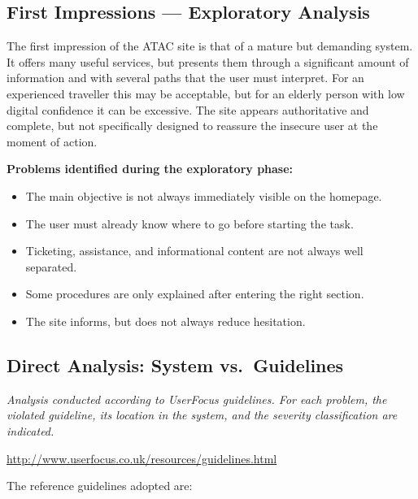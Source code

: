 ﻿\documentclass[11pt,a4paper]{article}
\begin{document}
\subsection*{First Impressions --- Exploratory Analysis}

\noindent The first impression of the ATAC site is that of a mature but demanding system. It offers many useful services, but presents them through a significant amount of information and with several paths that the user must interpret. For an experienced traveller this may be acceptable, but for an elderly person with low digital confidence it can be excessive. The site appears authoritative and complete, but not specifically designed to reassure the insecure user at the moment of action.

\noindent\textbf{Problems identified during the exploratory phase:}

\begin{itemize}
    \item The main objective is not always immediately visible on the homepage.
    \item The user must already know where to go before starting the task.
    \item Ticketing, assistance, and informational content are not always well separated.
    \item Some procedures are only explained after entering the right section.
    \item The site informs, but does not always reduce hesitation.
\end{itemize}

\subsection*{Direct Analysis: System vs.\ Guidelines}

\noindent\textit{Analysis conducted according to UserFocus guidelines. For each problem, the violated guideline, its location in the system, and the severity classification are indicated.}\\[2pt]
\raggedright\url{http://www.userfocus.co.uk/resources/guidelines.html}\par

\bigskip

\noindent The reference guidelines adopted are:
\end{document}
